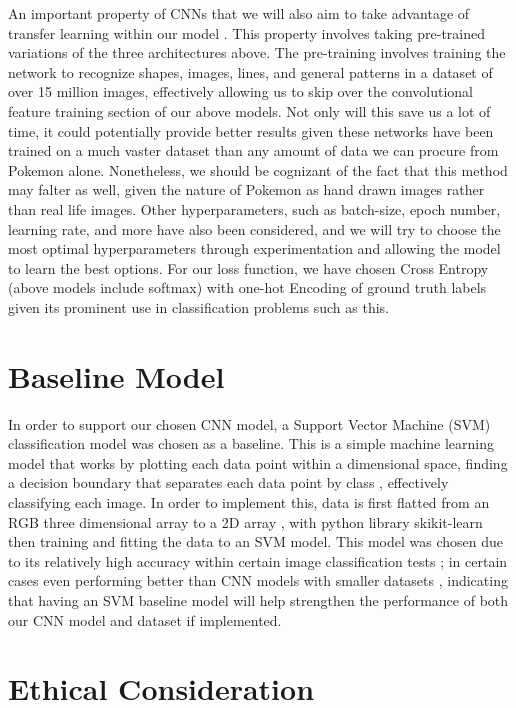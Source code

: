 \documentclass{article} %
\begin{document}
An important property of CNNs that we will also aim to take advantage of transfer learning within our model \citep{TransferLearning}. This property involves taking pre-trained variations of the three architectures above. The pre-training involves training the network to recognize shapes, images, lines, and general patterns in a dataset of over 15 million images, effectively allowing us to skip over the convolutional feature training section of our above models. Not only will this save us a lot of time, it could potentially provide better results given these networks have been trained on a much vaster dataset than any amount of data we can procure from Pokemon alone. Nonetheless, we should be cognizant of the fact that this method may falter as well, given the nature of Pokemon as hand drawn images rather than real life images. Other hyperparameters, such as batch-size, epoch number, learning rate, and more have also been considered, and we will try to choose the most optimal hyperparameters through experimentation and allowing the model to learn the best options. For our loss function, we have chosen Cross Entropy (above models include softmax) with one-hot Encoding of ground truth labels given its prominent use in classification problems such as this.

\section {Baseline Model}

In order to support our chosen CNN model, a Support Vector Machine (SVM) classification model was chosen as a baseline. This is a simple machine learning model that works by plotting each data point within a dimensional space, finding a decision boundary that separates each data point by class \citep{shanmukh_2021}, effectively classifying each image. In order to implement this, data is first flatted from an RGB three dimensional array to a 2D array \citep{varma_2020}, with python library skikit-learn then training and fitting the data to an SVM model. This model was chosen due to its relatively high accuracy within certain image classification tests \citep{scikit} \citep{WANG202161}; in certain cases even performing better than CNN models with smaller datasets \citep{WANG202161}, indicating that having an SVM baseline model will help strengthen the performance of both our CNN model and dataset if implemented.

\section {Ethical Consideration}
\end{document}
